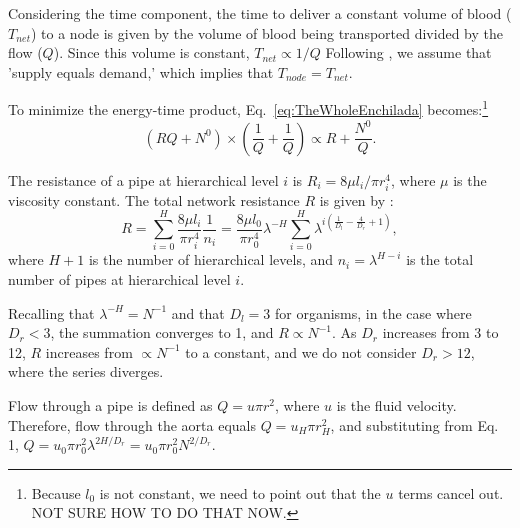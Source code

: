 \documentclass[12pt]{article}
\begin{document}
Considering the time component, the time to deliver a constant volume of blood ($T_{net}$) to a node 
is given by the volume of blood being transported divided by the 
flow ($Q$).  Since this volume is constant, $T_{net}\propto 
1/Q $ %
Following \cite{banavar10}, we assume that 'supply equals demand,' which implies that $T_{node} = T_{net}$.

To minimize the energy-time product, Eq.~\ref{eq:TheWholeEnchilada}
becomes:\footnote{Because $l_0$ is not constant, we need to
   point out that the $u$ terms cancel out.  NOT SURE HOW TO DO THAT
   NOW.}
\begin{equation}
 (RQ + N^0) \times (\frac{1}{Q} + \frac{1}{Q}) \propto R +
 \frac{N^0}{Q}.
\label{eq:bio-min}
\end{equation}

The resistance of a pipe 
at hierarchical level $i$ is $R_i = 8\mu l_i/\pi r_i^4$, where $\mu$ is 
the viscosity constant.  The total network resistance $R$ is given by 
\cite{west97}:
\begin{equation}
R = \sum_{i=0}^H \frac{8\mu l_i}{\pi r_i^4}\frac{1}{n_i}
= \frac{8\mu l_0}{\pi r_0^4} \lambda^{-H}\sum_{i=0}^H \lambda^{i 
\left(\frac{1}{D_l} - \frac{4}{D_r} + 1 \right)},
\end{equation}
where $H+1$ is the number of hierarchical levels, and $n_i = \lambda^{H-i}$ is the total number of pipes at hierarchical level $i$.  

Recalling that $\lambda^{-H} = N^{-1}$ and that $D_l = 3$ for organisms, 
in the case where $D_r <  3$, the summation converges to 1, and $R
\propto N^{-1}$.   As $D_r$ increases from 3 to 12, $R$ increases from
$\propto N^{-1}$ to a constant, and we do not consider $D_r > 12$, where the series diverges.



Flow through a pipe is defined as $Q = u\pi r^2$, where $u$ is the fluid 
velocity. 
Therefore, flow through the aorta equals
$Q = u_H \pi r_{H}^2$, and substituting from Eq. 1, $Q = u_0 \pi r_0^2
\lambda^{2H/D_r} = u_0 \pi r_0^2N^{2/D_r} $. 
\end{document}
